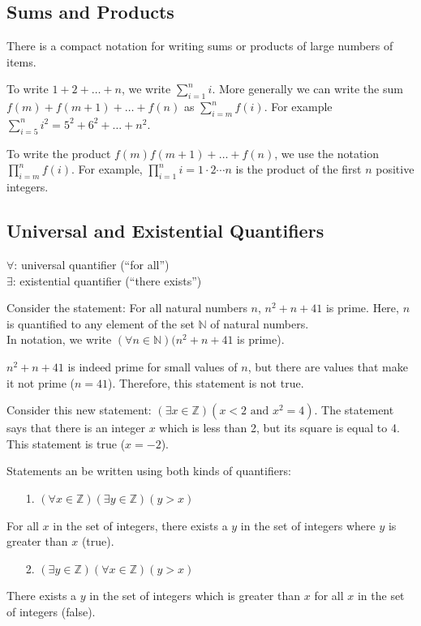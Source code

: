 \documentclass[12pt,a4paper]{article}
\begin{document}
\subsection*{Sums and Products}
There is a compact notation for writing sums or products of large numbers of items.

\bigbreak

To write $1+2+\dots+n$, we write $\sum_{i=1}^{n}i$. More generally we can write the sum $f(m)+f(m+1)+\dots+f(n)$ as $\sum_{i=m}^{n}f(i)$. For example $\sum_{i=5}^{n}i^2=5^2+6^2+\dots+n^2$.

\bigbreak

To write the product $f(m)f(m+1)+\dots+f(n)$, we use the notation $\prod_{i=m}^{n}f(i)$. For example, $\prod_{i=1}^{n}i=1\cdot 2\cdots n$ is the product of the first $n$ positive integers.

\subsection*{Universal and Existential Quantifiers}
$\forall$: universal quantifier (``for all'') \\
$\exists$: existential quantifier (``there exists'')

\bigbreak

Consider the statement: For all natural numbers $n$, $n^2+n+41$ is prime. Here, $n$ is quantified to any element of the set $\mathbb{N}$ of natural numbers. \\
In notation, we write $(\forall n \in \mathbb{N})(n^2+n+41$ is prime).

\bigbreak

$n^2+n+41$ is indeed prime for small values of $n$, but there are values that make it not prime ($n=41$). Therefore, this statement is not true.

\bigbreak

Consider this new statement: $(\exists x \in \mathbb{Z})(x<2 \text{ and } x^2=4)$. The statement says that there is an integer $x$ which is less than 2, but its square is equal to 4. This statement is true ($x=-2$).

\bigbreak

Statements an be written using both kinds of quantifiers:
\begin{itemize}
	\item[1.] $(\forall x \in \mathbb{Z})(\exists y \in \mathbb{Z})(y>x)$
\end{itemize}
For all $x$ in the set of integers, there exists a $y$ in the set of integers where $y$ is greater than $x$ (true).

\begin{itemize}
	\item[2.] $(\exists y \in \mathbb{Z})(\forall x \in \mathbb{Z})(y>x)$
\end{itemize}
There exists a $y$ in the set of integers which is greater than $x$ for all $x$ in the set of integers (false).
\end{document}
